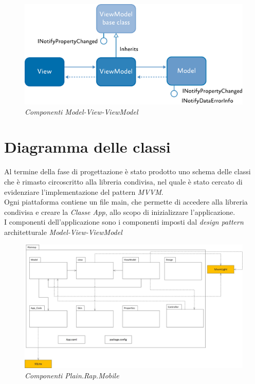 		\begin{figure}[ht]
			\centering
			\includegraphics[scale=0.35]{immagini/progettazione/IC448599.png}
			\caption{\textit{Componenti Model-View-ViewModel}}
		\end{figure}\FloatBarrier

\section{Diagramma delle classi}
Al termine della fase di progettazione è stato prodotto uno schema delle classi che è rimasto circoscritto alla libreria condivisa, nel quale è stato cercato di evidenziare l'implementazione del pattern \textit{MVVM}.
\\
Ogni piattaforma contiene un file main, che permette di accedere alla libreria condivisa e creare la \textit{Classe App}, allo scopo di inizializzare l'applicazione.
\\
I componenti dell'applicazione \app sono i componenti imposti dal \textit{design pattern} architetturale \textit{Model-View-ViewModel}
		\begin{figure}[ht]
			\centering
			\includegraphics[scale=0.35]{immagini/progettazione/plainrap_portable.jpg}
			\caption{\textit{Componenti Plain.Rap.Mobile}}
		\end{figure}\FloatBarrier
		
